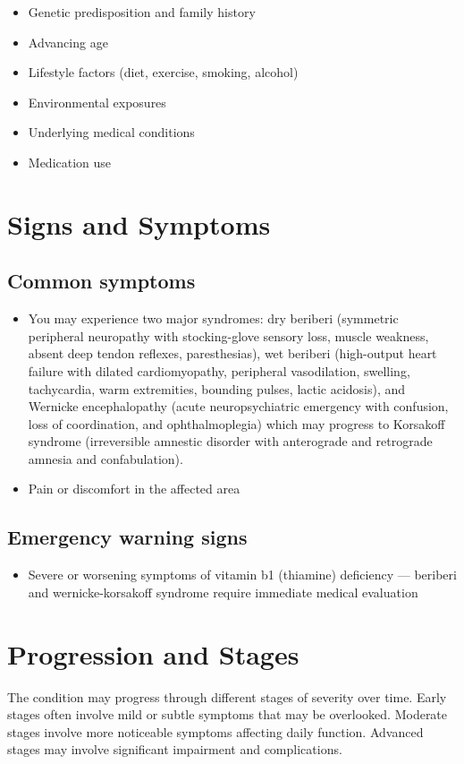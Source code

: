\begin{itemize}[noitemsep]
  \item Genetic predisposition and family history
  \item Advancing age
  \item Lifestyle factors (diet, exercise, smoking, alcohol)
  \item Environmental exposures
  \item Underlying medical conditions
  \item Medication use
\end{itemize}
\section{Signs and Symptoms}

\subsection{Common symptoms}
\begin{itemize}[noitemsep]
  \item You may experience two major syndromes: dry beriberi (symmetric peripheral neuropathy with stocking-glove sensory loss, muscle weakness, absent deep tendon reflexes, paresthesias), wet beriberi (high-output heart failure with dilated cardiomyopathy, peripheral vasodilation, swelling, tachycardia, warm extremities, bounding pulses, lactic acidosis), and Wernicke encephalopathy (acute neuropsychiatric emergency with confusion, loss of coordination, and ophthalmoplegia) which may progress to Korsakoff syndrome (irreversible amnestic disorder with anterograde and retrograde amnesia and confabulation).

  \item Pain or discomfort in the affected area
  \end{itemize}

\subsection{Emergency warning signs}
\begin{itemize}[noitemsep]
  \item Severe or worsening symptoms of vitamin b1 (thiamine) deficiency --- beriberi and wernicke-korsakoff syndrome require immediate medical evaluation
\end{itemize}
\section{Progression and Stages}
The condition may progress through different stages of severity over time. Early stages often involve mild or subtle symptoms that may be overlooked. Moderate stages involve more noticeable symptoms affecting daily function. Advanced stages may involve significant impairment and complications.
